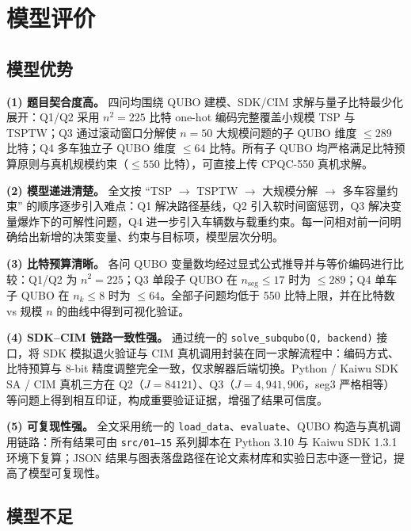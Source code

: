 \documentclass[UTF8,12pt,a4paper]{ctexart}
\begin{document}
\section{模型评价}

\subsection{模型优势}

\textbf{(1) 题目契合度高。} 四问均围绕 QUBO 建模、SDK/CIM 求解与量子比特最少化展开：Q1/Q2 采用 $n^2=225$ 比特 one-hot 编码完整覆盖小规模 TSP 与 TSPTW；Q3 通过滚动窗口分解使 $n=50$ 大规模问题的子 QUBO 维度 $\le 289$ 比特；Q4 多车独立子 QUBO 维度 $\le 64$ 比特。所有子 QUBO 均严格满足比特预算原则与真机规模约束（$\le 550$ 比特），可直接上传 CPQC-550 真机求解。

\textbf{(2) 模型递进清楚。} 全文按 ``TSP $\to$ TSPTW $\to$ 大规模分解 $\to$ 多车容量约束'' 的顺序逐步引入难点：Q1 解决路径基线，Q2 引入软时间窗惩罚，Q3 解决变量爆炸下的可解性问题，Q4 进一步引入车辆数与载重约束。每一问相对前一问明确给出新增的决策变量、约束与目标项，模型层次分明。

\textbf{(3) 比特预算清晰。} 各问 QUBO 变量数均经过显式公式推导并与等价编码进行比较：Q1/Q2 为 $n^2=225$；Q3 单段子 QUBO 在 $n_{\mathrm{seg}}\le 17$ 时为 $\le 289$；Q4 单车子 QUBO 在 $n_k\le 8$ 时为 $\le 64$。全部子问题均低于 550 比特上限，并在比特数 vs 规模 $n$ 的曲线中得到可视化验证。

\textbf{(4) SDK--CIM 链路一致性强。} 通过统一的 \texttt{solve\_subqubo(Q, backend)} 接口，将 SDK 模拟退火验证与 CIM 真机调用封装在同一求解流程中：编码方式、比特预算与 8-bit 精度调整完全一致，仅求解器后端切换。Python / Kaiwu SDK SA / CIM 真机三方在 Q2（$J=84121$）、Q3（$J=4{,}941{,}906$，seg3 严格相等）等问题上得到相互印证，构成重要验证证据，增强了结果可信度。

\textbf{(5) 可复现性强。} 全文采用统一的 \texttt{load\_data}、\texttt{evaluate}、QUBO 构造与真机调用链路：所有结果可由 \texttt{src/01--15} 系列脚本在 Python 3.10 与 Kaiwu SDK 1.3.1 环境下复算；JSON 结果与图表落盘路径在论文素材库和实验日志中逐一登记，提高了模型可复现性。

\subsection{模型不足}
\end{document}
